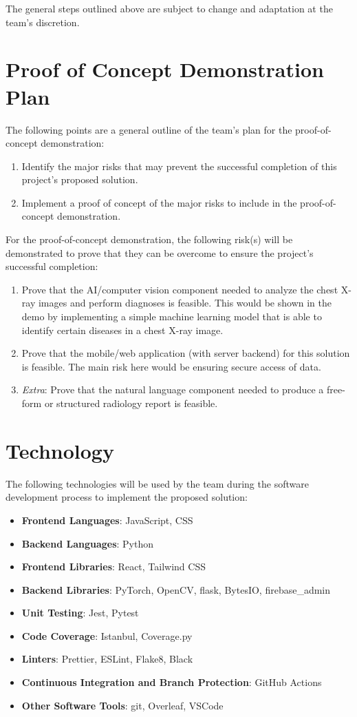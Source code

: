\documentclass{article}
\begin{document}
\noindent The general steps outlined above are subject to change and adaptation at the team’s discretion.

\section{Proof of Concept Demonstration Plan}

The following points are a general outline of the team’s plan for the proof-of-concept demonstration:
\begin{enumerate}
\item Identify the major risks that may prevent the successful completion of this project’s proposed solution.
\item Implement a proof of concept of the major risks to include in the proof-of-concept demonstration. \\
\end{enumerate}

\noindent For the proof-of-concept demonstration, the following risk(s) will be demonstrated to prove that they can be overcome to ensure the project’s successful completion:
\begin{enumerate}
\item Prove that the AI/computer vision component needed to analyze the chest X-ray images and perform diagnoses is feasible. This would be shown in the demo by implementing a simple machine learning model that is able to identify certain diseases in a chest X-ray image.
\item Prove that the mobile/web application (with server backend) for this solution is feasible. The main risk here would be ensuring secure access of data.
\item \textit{Extra}: Prove that the natural language component needed to produce a free-form or structured radiology report is feasible.
\end{enumerate}

\section{Technology}

The following technologies will be used by the team during the software development process to implement the proposed solution:
\begin{itemize}
\item \textbf{Frontend Languages}: JavaScript, CSS
\item \textbf{Backend Languages}: Python
\item \textbf{Frontend Libraries}: React, Tailwind CSS
\item \textbf{Backend Libraries}: PyTorch, OpenCV, flask, BytesIO, firebase\_admin
\item \textbf{Unit Testing}: Jest, Pytest
\item \textbf{Code Coverage}: Istanbul, Coverage.py
\item \textbf{Linters}: Prettier, ESLint, Flake8, Black
\item \textbf{Continuous Integration and Branch Protection}: GitHub Actions
\item \textbf{Other Software Tools}: git, Overleaf, VSCode
\end{itemize}
\end{document}
